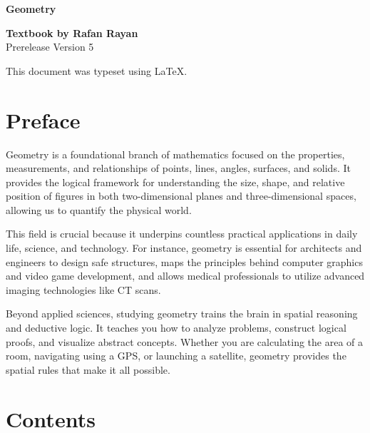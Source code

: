 \documentclass[openany, twoside]{book}
\begin{document}
\begin{titlepage}
    \vspace*{1mm}
    {\Huge \bfseries Geometry}
    \vspace*{\fill}
    \begin{flushright}
        {\Large \bfseries Textbook by Rafan Rayan} \\
        \smallskip
        Prerelease Version 5
    \end{flushright}
    \vspace*{1mm}
\end{titlepage}

\thispagestyle{empty}
\vspace*{\fill}

\begin{center}
    \small This document was typeset using \LaTeX.
\end{center}

\clearpage

\frontmatter
\pagestyle{frontmatter}

\section*{Preface}

Geometry is a foundational branch of mathematics focused on the properties, measurements, and relationships of points, lines, angles, surfaces, and solids. It provides the logical framework for understanding the size, shape, and relative position of figures in both two-dimensional planes and three-dimensional spaces, allowing us to quantify the physical world.

This field is crucial because it underpins countless practical applications in daily life, science, and technology. For instance, geometry is essential for architects and engineers to design safe structures, maps the principles behind computer graphics and video game development, and allows medical professionals to utilize advanced imaging technologies like CT scans.

Beyond applied sciences, studying geometry trains the brain in spatial reasoning and deductive logic. It teaches you how to analyze problems, construct logical proofs, and visualize abstract concepts. Whether you are calculating the area of a room, navigating using a GPS, or launching a satellite, geometry provides the spatial rules that make it all possible.

\section*{Contents}
\end{document}
